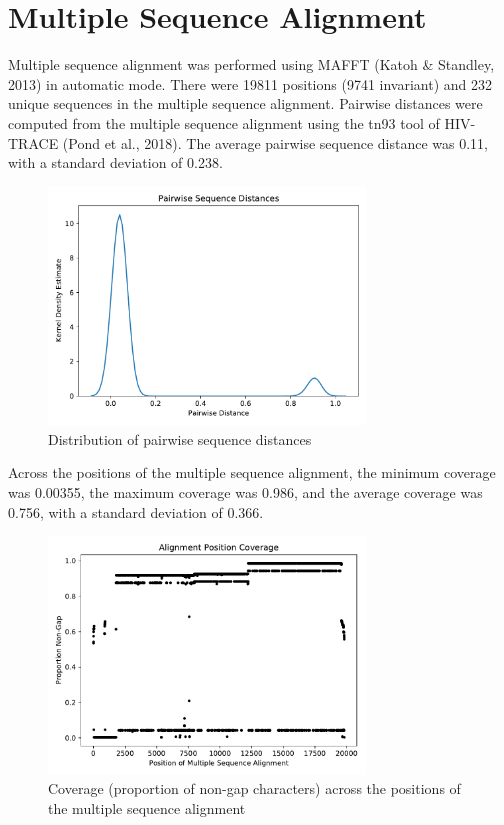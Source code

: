\documentclass{article}
\begin{document}
\section{Multiple Sequence Alignment}
Multiple sequence alignment was performed using MAFFT (Katoh \& Standley, 2013) in automatic mode. There were 19811 positions (9741 invariant) and 232 unique sequences in the multiple sequence alignment. Pairwise distances were computed from the multiple sequence alignment using the tn93 tool of HIV-TRACE (Pond et al., 2018). The average pairwise sequence distance was 0.11, with a standard deviation of 0.238.

\begin{figure}[h]
\centering
\includegraphics[width=0.75\textwidth,keepaspectratio]{./figs/pairwise_distances_sequences.pdf}
\caption{Distribution of pairwise sequence distances}
\end{figure}

Across the positions of the multiple sequence alignment, the minimum coverage was 0.00355, the maximum coverage was 0.986, and the average coverage was 0.756, with a standard deviation of 0.366.

\begin{figure}[h]
\centering
\includegraphics[width=0.75\textwidth,keepaspectratio]{./figs/alignment_coverage.pdf}
\caption{Coverage (proportion of non-gap characters) across the positions of the multiple sequence alignment}
\end{figure}
\end{document}

